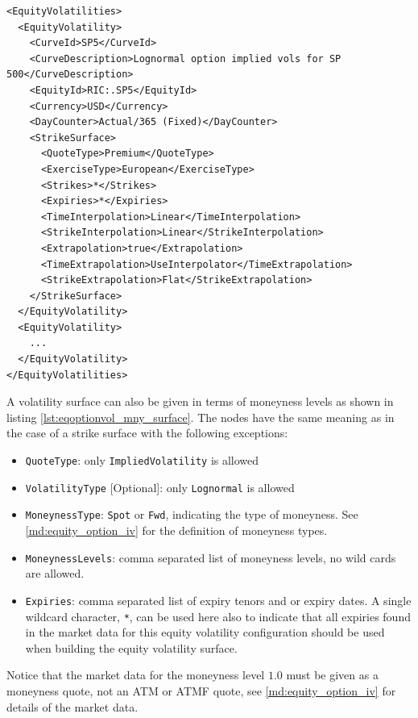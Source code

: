 \begin{longlisting}
\begin{verbatim}
<EquityVolatilities>
  <EquityVolatility>
    <CurveId>SP5</CurveId>
    <CurveDescription>Lognormal option implied vols for SP 500</CurveDescription>
    <EquityId>RIC:.SP5</EquityId>
    <Currency>USD</Currency>
    <DayCounter>Actual/365 (Fixed)</DayCounter>
    <StrikeSurface>
      <QuoteType>Premium</QuoteType>
      <ExerciseType>European</ExerciseType>
      <Strikes>*</Strikes>
      <Expiries>*</Expiries>
      <TimeInterpolation>Linear</TimeInterpolation>
      <StrikeInterpolation>Linear</StrikeInterpolation>
      <Extrapolation>true</Extrapolation>
      <TimeExtrapolation>UseInterpolator</TimeExtrapolation>
      <StrikeExtrapolation>Flat</StrikeExtrapolation>
    </StrikeSurface>
  </EquityVolatility>
  <EquityVolatility>
    ...
  </EquityVolatility>
</EquityVolatilities>
\end{verbatim}
\caption{Equity option volatility configuration - strike surface}
\label{lst:eqoptionvol_surface}
\end{longlisting}

A volatility surface can also be given in terms of moneyness levels as shown in listing
\ref{lst:eqoptionvol_mny_surface}. The nodes have the same meaning as in the case of a strike surface with the following
exceptions:

\begin{itemize}
\item \lstinline!QuoteType!: only \lstinline!ImpliedVolatility! is allowed
\item \lstinline!VolatilityType! [Optional]: only \lstinline!Lognormal! is allowed
\item \lstinline!MoneynessType!: \lstinline!Spot! or \lstinline!Fwd!, indicating the type of moneyness. See
  \ref{md:equity_option_iv} for the definition of moneyness types.
\item \lstinline!MoneynessLevels!: comma separated list of moneyness levels, no wild cards are allowed.
\item \lstinline!Expiries!: comma separated list of expiry tenors and or expiry dates. A single wildcard character, \lstinline!*!, can be used here also to indicate that all expiries found in the market data for this equity volatility configuration should be used when building the equity volatility surface.
\end{itemize}

Notice that the market data for the moneyness level $1.0$ must be given as a moneyness quote, not an ATM or ATMF quote,
see \ref{md:equity_option_iv} for details of the market data.

